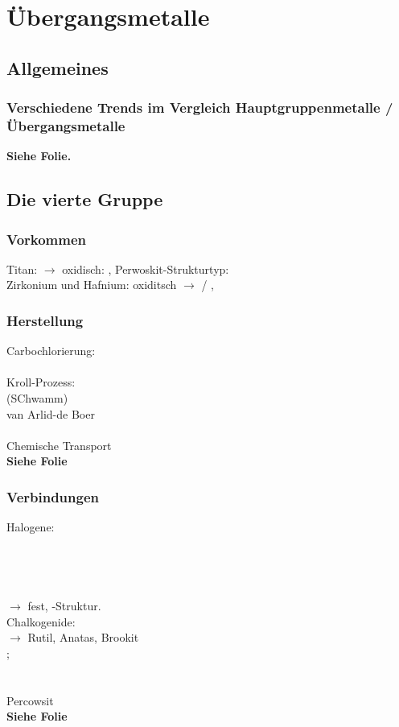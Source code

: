 \documentclass{article}
\begin{document}
\section{Übergangsmetalle}
\subsection{Allgemeines}
\subsubsection{Verschiedene Trends im Vergleich Hauptgruppenmetalle / Übergangsmetalle}
\textbf{Siehe Folie.}
\subsection{Die vierte Gruppe}
\subsubsection{Vorkommen}
Titan: $\rightarrow$ oxidisch: , Perwoskit-Strukturtyp: \\
Zirkonium und Hafnium: oxiditsch $\rightarrow$  / , 
\subsubsection{Herstellung}
Carbochlorierung:\\
\\
Kroll-Prozess:\\
 (SChwamm)\\
van Arlid-de Boer\\
\\
Chemische Transport\\
\textbf{Siehe Folie}\\
\subsubsection{Verbindungen}
Halogene:\\
\\
\\
\\
\\
$\rightarrow$ fest, -Struktur.\\
Chalkogenide:\\
 $\rightarrow$ Rutil, Anatas, Brookit\\
; \\
\\
\\
Percowsit \\
\textbf{Siehe Folie}
\end{document}
